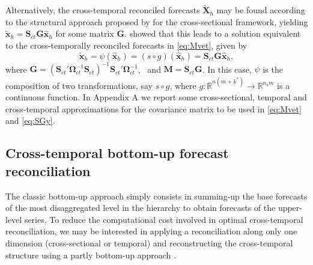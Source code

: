 \documentclass[12pt]{article}
\newcommand{\xvet}{\bm{x}}
\newcommand{\Gvet}{\bm{G}}
\newcommand{\Mvet}{\bm{M}}
\newcommand{\Svet}{\bm{S}}
\newcommand{\Xvet}{\bm{X}}
\newcommand{\Omegavet}{\bm{\Omega}}
\theoremstyle{definition}
\begin{document}
Alternatively, the cross-temporal reconciled forecasts $\widetilde{\Xvet}_{h}$ may be found according to the structural approach proposed by \cite{hyndman2011} for the cross-sectional framework, yielding $\widetilde{\xvet}_h = \Svet_{ct}\Gvet \widehat{\xvet}_h$ for some matrix $\Gvet$. \citet{wickramasuriya2019} showed that this leads to a solution equivalent to the cross-temporally reconciled forecasts in \eqref{eq:Mvet}, given by
\begin{equation}\label{eq:SGy}
	\widetilde{\xvet}_{h} = \psi\left(\widehat{\xvet}_h \right) = \left(s \circ g \right)\left(\widehat{\xvet}_h\right)=\Svet_{ct}\Gvet \widehat{\xvet}_{h},
\end{equation}
where $\Gvet = (\Svet_{ct}' \Omegavet_{ct}^{-1}\Svet_{ct})^{-1} \Svet_{ct}'\Omegavet_{ct}^{-1}$,~ and $\Mvet = \Svet_{ct} \Gvet$. In this case, $\psi$ is the composition of two transformations, say $s \circ g$, where $g: \mathbb{R}^{n(m+k^\ast)} \rightarrow \mathbb{R}^{n_b m}$ is a continuous function. In Appendix A we report some cross-sectional, temporal and cross-temporal approximations for the covariance matrix to be used in \eqref{eq:Mvet} and \eqref{eq:SGy}.

\subsection{Cross-temporal bottom-up forecast reconciliation}\label{ssec:ctbu}

The classic bottom-up approach \citep{dunn1976, dangerfield1992} simply consists in summing-up the base forecasts of the most disaggregated level in the hierarchy to obtain forecasts of the upper-level series. To reduce the computational cost involved in optimal cross-temporal reconciliation, we may be interested in applying a reconciliation along only one dimension (cross-sectional or temporal) and reconstructing the cross-temporal structure using a partly bottom-up approach \citep{difonzo2022b, difonzo2023a, sanguri2022}.
\end{document}
